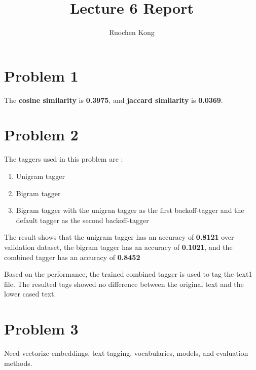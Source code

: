 \documentclass[a4paper,11pt]{article}
\begin{document}
\title{Lecture 6 Report}

\author{Ruochen Kong}

\date{}
\maketitle

\section{Problem 1}

The \textbf{cosine similarity} is \textbf{0.3975}, and \textbf{jaccard similarity} is \textbf{0.0369}.

\section{Problem 2}

The taggers used in this problem are :
\begin{enumerate}
  \item Unigram tagger
  \item Bigram tagger
  \item Bigram tagger with the unigran tagger as the first backoff-tagger and the default tagger as the second backoff-tagger
\end{enumerate}

The result shows that the unigram tagger has an accuracy of \textbf{0.8121} over validation dataset, the bigram tagger has an accuracy of \textbf{0.1021}, and the combined tagger has an accuracy of \textbf{0.8452}

Based on the performance, the trained combined tagger is used to tag the text1 file.
The resulted tags showed no difference between the original text and the lower cased text.

\section{Problem 3}

Need vectorize embeddings, text tagging, vocabularies, models, and evaluation methods.
\end{document}
